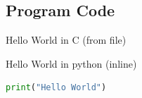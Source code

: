 \documentclass[12pt]{article}
\numberwithin{equation}{section} %
\numberwithin{figure}{section} %
\numberwithin{table}{section} %
\begin{document}
\begin{appendices}
 
\section{Program Code}
% 
Hello World in C (from file)



Hello World in python (inline)
\begin{lstlisting}[language=python]
print("Hello World")
\end{lstlisting}

\end{appendices}
\end{document}
